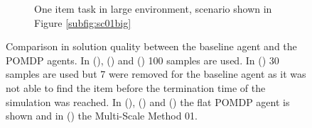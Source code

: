 \begin{figure}
\begin{subfigure}[t]{0.49\textwidth}
        \caption{One item task in large environment, scenario shown in Figure \ref{subfig:sc01big} }
        \label{subfig:b1vsFlat_sc01Big}
    \end{subfigure}
    \caption{Comparison in solution quality between the baseline agent and the POMDP agents. In (), () and () 100 samples are used. In () 30 samples are used but 7 were removed for the baseline agent as it was not able to find the item before the termination time of the simulation was reached. In (), () and () the flat POMDP agent is shown and in () the Multi-Scale Method 01.}
    \label{fig:b1vsFlat}
\end{figure}
